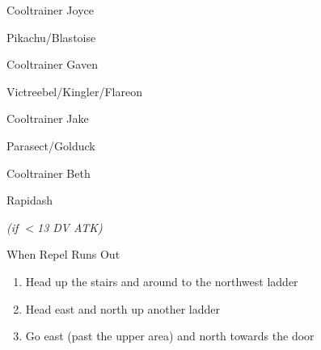 \begin{paracol}{2}
\switchcolumn
\begin{trainer}{Cooltrainer Joyce}
	\varwb
	\begin{fightSection}{Pikachu/Blastoise}
		\item {} \strength{} 
	\end{fightSection}
	\varwe
\end{trainer}

\switchcolumn
\begin{trainer}{Cooltrainer Gaven}
	\varwb
	\begin{fightSection}{Victreebel/Kingler/Flareon}
		\item {} \return{} 
	\end{fightSection}
	\varwe
\end{trainer}

\begin{trainer}{Cooltrainer Jake}
	\varwb
	\begin{fightSection}{Parasect/Golduck}
		\item {} \return{} 
	\end{fightSection}
	\varwe
\end{trainer}

\newpage
\begin{trainer}{Cooltrainer Beth}
	\varwb
	\begin{fightSection}{Rapidash}
		\item {} \return
		\begin{notes}
			\small{\item {} \surf{} \textit{(if $<$13 DV ATK)}}
		\end{notes}
	\end{fightSection}
	\varwe
\end{trainer}

\switchcolumn*
\begin{menu}{When Repel Runs Out}
	\varwb
	\begin{packMenu}
		\item \superRepel
	\end{packMenu}
	\varwe
\end{menu}

\switchcolumn
\begin{enumerate}[resume]
	\item Head up the stairs and around to the northwest ladder
	\item Head east and north up another ladder
	\item Go east (past the upper area) and north towards the door
\end{enumerate}


\end{paracol}
